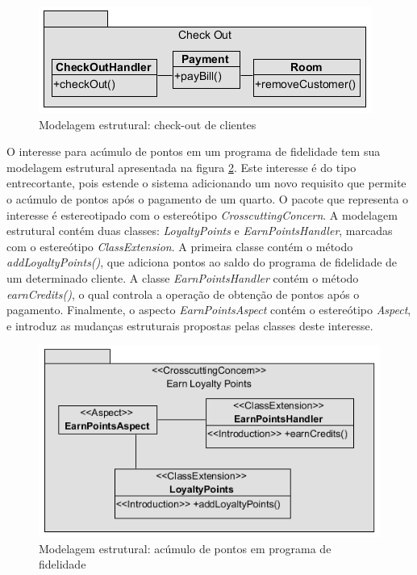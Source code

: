   \begin{figure}
	\centering
	\includegraphics{img/case_study_structural_check_out.png}
	\caption{Modelagem estrutural: check-out de clientes}\label{fig:case_study_structural_check_out}
  \end{figure}

O interesse para acúmulo de pontos em um programa de fidelidade tem sua modelagem estrutural apresentada na figura
\ref{fig:case_study_structural_earn_points}. Este interesse é do tipo entrecortante, pois estende o sistema adicionando um novo requisito que
permite o acúmulo de pontos após o pagamento de um quarto. O pacote que representa o interesse é estereotipado com o estereótipo
\textit{CrosscuttingConcern}. A modelagem estrutural contém duas classes: \textit{LoyaltyPoints} e \textit{EarnPointsHandler}, marcadas com o
estereótipo \textit{ClassExtension}. A primeira classe contém o método \textit{addLoyaltyPoints()}, que adiciona pontos ao saldo do programa de
fidelidade de um determinado cliente. A classe \textit{EarnPointsHandler} contém o método \textit{earnCredits()}, o qual controla a operação de
obtenção de pontos após o pagamento. Finalmente, o aspecto \textit{EarnPointsAspect} contém o estereótipo \textit{Aspect}, e introduz as mudanças
estruturais propostas pelas classes deste interesse.

  \begin{figure}
	\centering
	\includegraphics{img/case_study_structural_earn_points.png}
	\caption{Modelagem estrutural: acúmulo de pontos em programa de fidelidade}\label{fig:case_study_structural_earn_points}
  \end{figure}

